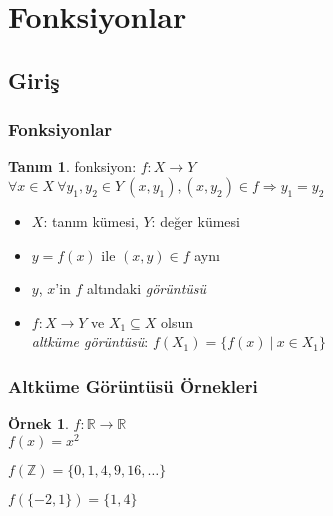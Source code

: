 \documentclass[dvipsnames]{beamer}
\theoremstyle{definition}
\newtheorem{tanim}[theorem]{Tanım}
\theoremstyle{example}
\newtheorem{ornek}[theorem]{Örnek}
\theoremstyle{plain}
\begin{document}
\section{Fonksiyonlar}

\subsection{Giriş}

\begin{frame}
  \frametitle{Fonksiyonlar}

  \begin{tanim}
    \alert{fonksiyon}: $f: X \rightarrow Y$\\
    $\forall x \in X~\forall y_1,y_2 \in Y~
      (x,y_1),(x,y_2) \in f \Rightarrow y_1=y_2$
  \end{tanim}

  \medskip
  \begin{itemize}
    \item $X$: \alert{tanım kümesi}, $Y$: \alert{değer kümesi}

    \pause
    \medskip
    \item $y = f(x)$ ile $(x,y) \in f$ aynı
    \item $y$, $x$'in $f$ altındaki \emph{görüntüsü}

    \pause
    \medskip
    \item $f: X \rightarrow Y$ ve $X_1 \subseteq X$ olsun\\
      \emph{altküme görüntüsü}: $f(X_1) = \{f(x)~|~x \in X_1\}$
  \end{itemize}
\end{frame}

\begin{frame}
  \frametitle{Altküme Görüntüsü Örnekleri}

  \begin{ornek}
    $f: \mathbb{R} \rightarrow \mathbb{R}$\\
    $f(x) = x^2$

    \pause
    \bigskip
    $f(\mathbb{Z}) = \{0,1,4,9,16,\dots\}$

    \medskip
    $f(\{-2,1\}) = \{1,4\}$
  \end{ornek}
\end{frame}
\end{document}
